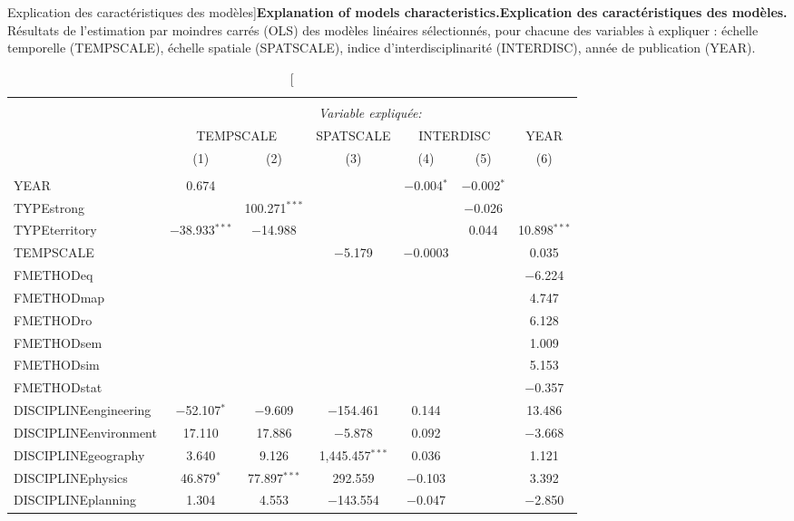 \begin{table}[!htbp]
\caption[Explanation of models characteristics][Explication des caractéristiques des modèles]{\textbf{Explanation of models characteristics.}}{\textbf{Explication des caractéristiques des modèles.} Résultats de l'estimation par moindres carrés (OLS) des modèles linéaires sélectionnés, pour chacune des variables à expliquer : échelle temporelle (TEMPSCALE), échelle spatiale (SPATSCALE), indice d'interdisciplinarité (INTERDISC), année de publication (YEAR).\label{tab:quantepistemo:regressions}}
\begin{tabular}{lcccccc} 
\footnotesize
\\[-1.8ex]\hline 
\hline \\[-1.8ex] 
 & \multicolumn{6}{c}{\textit{Variable expliquée:}} \\ 
\cline{2-7} 
 & \multicolumn{2}{c}{TEMPSCALE} & SPATSCALE & \multicolumn{2}{c}{INTERDISC} & YEAR \\ 
 & (1) & (2) & (3) & (4) & (5) & (6)\\ 
\hline \\[-1.8ex] 
 YEAR & 0.674 &  &  & $-$0.004$^{*}$ & $-$0.002$^{*}$ &  \\ 
  TYPEstrong &  & 100.271$^{***}$ &  &  & $-$0.026 &  \\ 
  TYPEterritory & $-$38.933$^{***}$ & $-$14.988 &  &  & 0.044 & 10.898$^{***}$ \\ 
  TEMPSCALE &  &  & $-$5.179 & $-$0.0003 &  & 0.035 \\ 
  FMETHODeq &  &  &  &  &  & $-$6.224 \\ 
  FMETHODmap &  &  &  &  &  & 4.747 \\ 
  FMETHODro &  &  &  &  &  & 6.128 \\ 
  FMETHODsem &  &  &  &  &  & 1.009 \\ 
  FMETHODsim &  &  &  &  &  & 5.153 \\ 
  FMETHODstat &  &  &  &  &  & $-$0.357 \\ 
  DISCIPLINEengineering & $-$52.107$^{*}$ & $-$9.609 & $-$154.461 & 0.144 &  & 13.486 \\ 
  DISCIPLINEenvironment & 17.110 & 17.886 & $-$5.878 & 0.092 &  & $-$3.668 \\ 
  DISCIPLINEgeography & 3.640 & 9.126 & 1,445.457$^{***}$ & 0.036 &  & 1.121 \\ 
  DISCIPLINEphysics & 46.879$^{*}$ & 77.897$^{***}$ & 292.559 & $-$0.103 &  & 3.392 \\ 
  DISCIPLINEplanning & 1.304 & 4.553 & $-$143.554 & $-$0.047 &  & $-$2.850 \\ 

\end{tabular}
\end{table}
